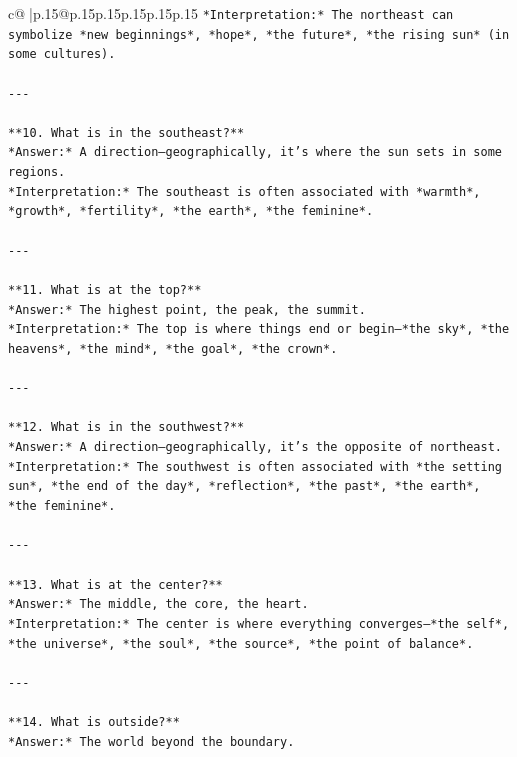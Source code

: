 \documentclass{article}
\begin{document}
{\begin{supertabular}{c@{$\;$}|p{.15\linewidth}@{}p{.15\linewidth}p{.15\linewidth}p{.15\linewidth}p{.15\linewidth}p{.15\linewidth}}
{{{\texttt{*Interpretation:* The northeast can symbolize *new beginnings*, *hope*, *the future*, *the rising sun* (in some cultures).} \\
\\ 
\texttt{{-}{-}{-}} \\
\\ 
\texttt{**10. What is in the southeast?**  } \\
\texttt{*Answer:* A direction—geographically, it’s where the sun sets in some regions.  } \\
\texttt{*Interpretation:* The southeast is often associated with *warmth*, *growth*, *fertility*, *the earth*, *the feminine*.} \\
\\ 
\texttt{{-}{-}{-}} \\
\\ 
\texttt{**11. What is at the top?**  } \\
\texttt{*Answer:* The highest point, the peak, the summit.  } \\
\texttt{*Interpretation:* The top is where things end or begin—*the sky*, *the heavens*, *the mind*, *the goal*, *the crown*.} \\
\\ 
\texttt{{-}{-}{-}} \\
\\ 
\texttt{**12. What is in the southwest?**  } \\
\texttt{*Answer:* A direction—geographically, it’s the opposite of northeast.  } \\
\texttt{*Interpretation:* The southwest is often associated with *the setting sun*, *the end of the day*, *reflection*, *the past*, *the earth*, *the feminine*.} \\
\\ 
\texttt{{-}{-}{-}} \\
\\ 
\texttt{**13. What is at the center?**  } \\
\texttt{*Answer:* The middle, the core, the heart.  } \\
\texttt{*Interpretation:* The center is where everything converges—*the self*, *the universe*, *the soul*, *the source*, *the point of balance*.} \\
\\ 
\texttt{{-}{-}{-}} \\
\\ 
\texttt{**14. What is outside?**  } \\
\texttt{*Answer:* The world beyond the boundary.  } \\
}}}
\end{supertabular}}
\end{document}
